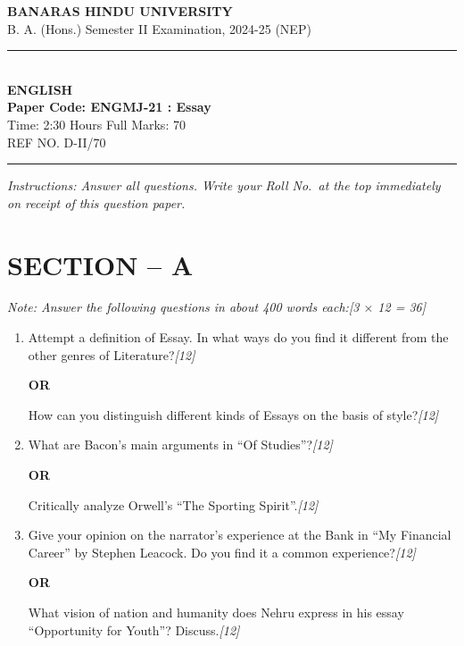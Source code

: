 \documentclass[11pt,a4paper]{article}
\newcommand{\pts}[1]{\hfill \textit{[#1]}}
\begin{document}
\begin{center}
  {\large\bfseries BANARAS HINDU UNIVERSITY}\\[2pt]
  {\normalsize B. A. (Hons.) Semester II Examination, 2024-25 (NEP)}\\[6pt]
  \rule{0.8\linewidth}{0.5pt}\\[6pt]
  {\large\bfseries ENGLISH}\\[4pt]
  {\large\bfseries Paper Code: ENGMJ-21 : Essay}\\[4pt]
  {\normalsize Time: 2:30 Hours \hfill Full Marks: 70}\\[2pt]
  {\small REF NO. D-II/70}
\end{center}
\rule{\linewidth}{0.4pt}
\smallskip

\noindent \textit{Instructions: Answer all questions. Write your Roll No.\ at the top immediately on receipt of this question paper.}

\bigskip

\section*{SECTION -- A}
\noindent \textit{Note: Answer the following questions in about 400 words each:}\pts{3 $\times$ 12 = 36}

\begin{enumerate}[label=\textbf{\arabic*.},leftmargin=*,itemsep=12pt]

  \item Attempt a definition of Essay. In what ways do you find it different from the other genres of Literature?\pts{12}

  \begin{center}\textbf{OR}\end{center}

  How can you distinguish different kinds of Essays on the basis of style?\pts{12}

  \item What are Bacon's main arguments in ``Of Studies''?\pts{12}

  \begin{center}\textbf{OR}\end{center}

  Critically analyze Orwell's ``The Sporting Spirit''.\pts{12}

  \item Give your opinion on the narrator's experience at the Bank in ``My Financial Career'' by Stephen Leacock. Do you find it a common experience?\pts{12}

  \begin{center}\textbf{OR}\end{center}

  What vision of nation and humanity does Nehru express in his essay ``Opportunity for Youth''? Discuss.\pts{12}

\end{enumerate}
\end{document}
